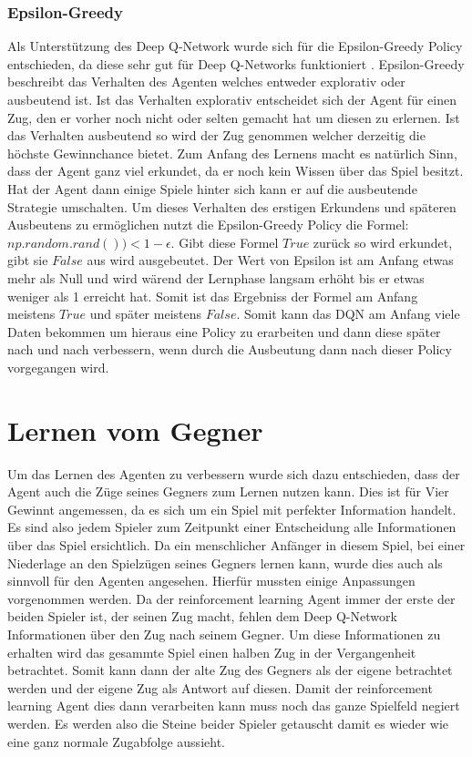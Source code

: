 \subsubsection{Epsilon-Greedy}
Als Unterstützung des Deep Q-Network wurde sich für die Epsilon-Greedy Policy entschieden, da diese sehr gut für Deep Q-Networks funktioniert \cite{Meire2017}. Epsilon-Greedy beschreibt das Verhalten des Agenten welches entweder explorativ oder ausbeutend ist. Ist das Verhalten explorativ entscheidet sich der Agent für einen Zug, den er vorher noch nicht oder selten gemacht hat um diesen zu erlernen. Ist das Verhalten ausbeutend so wird der Zug genommen welcher derzeitig die höchste Gewinnchance bietet. Zum Anfang des Lernens macht es natürlich Sinn, dass der Agent ganz viel erkundet, da er noch kein Wissen über das Spiel besitzt. Hat der Agent dann einige Spiele hinter sich kann er auf die ausbeutende Strategie umschalten. Um dieses Verhalten des erstigen Erkundens und späteren Ausbeutens zu ermöglichen nutzt die Epsilon-Greedy Policy die Formel: $np.random.rand())<1-\epsilon$. Gibt diese Formel $True$ zurück so wird erkundet, gibt sie $False$ aus wird ausgebeutet. Der Wert von Epsilon ist am Anfang etwas mehr als Null und wird wärend der Lernphase langsam erhöht bis er etwas weniger als 1 erreicht hat. Somit ist das Ergebniss der Formel am Anfang meistens $True$ und später meistens $False$. Somit kann das DQN am Anfang viele Daten bekommen um hieraus eine Policy zu erarbeiten und dann diese später nach und nach verbessern, wenn durch die Ausbeutung dann nach dieser Policy vorgegangen wird.


\section{Lernen vom Gegner}
Um das Lernen des Agenten zu verbessern wurde sich dazu entschieden, dass der Agent auch die Züge seines Gegners zum Lernen nutzen kann. Dies ist für Vier Gewinnt angemessen, da es sich um ein Spiel mit perfekter Information handelt. Es sind also jedem Spieler zum Zeitpunkt einer Entscheidung alle Informationen über das Spiel ersichtlich. Da ein menschlicher Anfänger in diesem Spiel, bei einer Niederlage an den Spielzügen seines Gegners lernen kann, wurde dies auch als sinnvoll für den Agenten angesehen. Hierfür mussten einige Anpassungen vorgenommen werden. Da der reinforcement learning Agent immer der erste der beiden Spieler ist, der seinen Zug macht, fehlen dem Deep Q-Network Informationen über den Zug nach seinem Gegner. 
Um diese Informationen zu erhalten wird das gesammte Spiel einen halben Zug in der Vergangenheit betrachtet. Somit kann dann der alte Zug des Gegners als der eigene betrachtet werden und der eigene Zug als Antwort auf diesen. Damit der reinforcement learning Agent dies dann verarbeiten kann muss noch das ganze Spielfeld negiert werden. Es werden also die Steine beider Spieler getauscht damit es wieder wie eine ganz normale Zugabfolge aussieht. 

